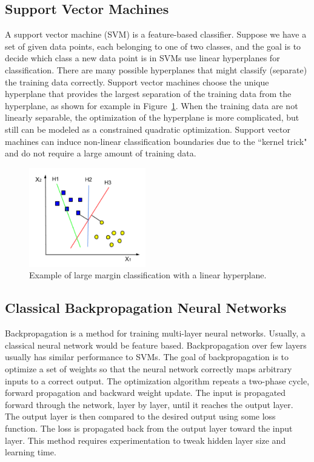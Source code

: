 \subsection{Support Vector Machines}
A support vector machine (SVM) is a feature-based classifier. Suppose we have a set of given data points, each belonging to one of two classes, and the goal is to decide which class a new data point is in SVMs use linear hyperplanes for classification. There are many possible hyperplanes that might classify (separate) the training data correctly. Support vector machines choose the unique hyperplane that provides the largest separation of the training data from the hyperplane, as shown for example in Figure~\ref{fig:svm}. When the training data are not linearly separable, the optimization of the hyperplane is more complicated, but still can be modeled as a constrained quadratic optimization. Support vector machines can induce non-linear classification boundaries due to the \textquotedblleft kernel trick" and do not require a large amount of training data.

\begin{figure}[t]
  \centering
  \includegraphics[width=2in]{figures/svm.jpg}   
  \caption[svm]{Example of large margin classification with a linear hyperplane.}
  \label{fig:svm}
\end{figure}


\subsection{Classical Backpropagation Neural Networks}
Backpropagation is a method for training multi-layer neural networks. Usually, a classical neural network would be feature based. Backpropagation over few layers usually has  similar performance to SVMs. The goal of backpropagation is to optimize a set of weights so that the neural network correctly maps arbitrary inputs to a correct output. The optimization algorithm repeats a two-phase cycle, forward propagation and backward weight update. The input is propagated forward through the network, layer by layer, until it reaches the output layer. The output layer is then compared to the desired output using some loss function. The loss is propagated back from the output layer toward the input layer. This method requires  experimentation to tweak hidden layer size and learning time.

